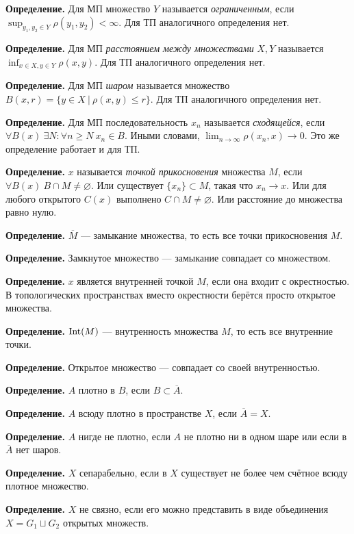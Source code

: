 \textbf{Определение.} Для МП множество $Y$ называется \textit{ограниченным}, если $\sup_{y_1, y_2 \in Y} \rho(y_1, y_2) < \infty$.
Для ТП аналогичного определения нет.

\textbf{Определение.} Для МП \textit{расстоянием между множествами} $X, Y$ называется $\inf_{x \in X, y \in Y} \rho(x, y)$.
Для ТП аналогичного определения нет.

\textbf{Определение.} Для МП \textit{шаром} называется множество $B(x, r) = \{y \in X~|~\rho(x, y) \le r\}$.
Для ТП аналогичного определения нет.

\textbf{Определение.} Для МП последовательность $x_n$ называется \textit{сходящейся}, если $\forall B(x)~\exists N: \forall n \ge N~x_n \in B$.
Иными словами, $\lim_{n \to \infty} \rho(x_n, x) \to 0$.
Это же определение работает и для ТП.

\textbf{Определение.} $x$ называется \textit{точкой прикосновения} множества $M$, если $\forall B(x)~B \cap M \ne \varnothing$.
Или существует $\{x_n\} \subset M$, такая что $x_n \to x$.
Или для любого открытого $C(x)$ выполнено $C \cap M \ne \varnothing$.
Или расстояние до множества равно нулю.

\textbf{Определение.} $\overline M$ --- замыкание множества, то есть все точки прикосновения $M$.

\textbf{Определение.} Замкнутое множество --- замыкание совпадает со множеством.

\textbf{Определение.} $x$ является внутренней точкой $M$, если она входит с окрестностью.
В топологических пространствах вместо окрестности берётся просто открытое множества.

\textbf{Определение.} $\operatorname{Int}(M)$ --- внутренность множества $M$, то есть все внутренние точки.

\textbf{Определение.} Открытое множество --- совпадает со своей внутренностью.

\textbf{Определение.} $A$ плотно в $B$, если $B \subset \overline A$.

\textbf{Определение.} $A$ всюду плотно в пространстве $X$, если $\overline A = X$.

\textbf{Определение.} $A$ нигде не плотно, если $A$ не плотно ни в одном шаре или если в $\overline A$ нет шаров.

\textbf{Определение.} $X$ сепарабельно, если в $X$ существует не более чем счётное всюду плотное множество.

\textbf{Определение.} $X$ не связно, если его можно представить в виде объединения $X = G_1 \sqcup G_2$ открытых множеств.

